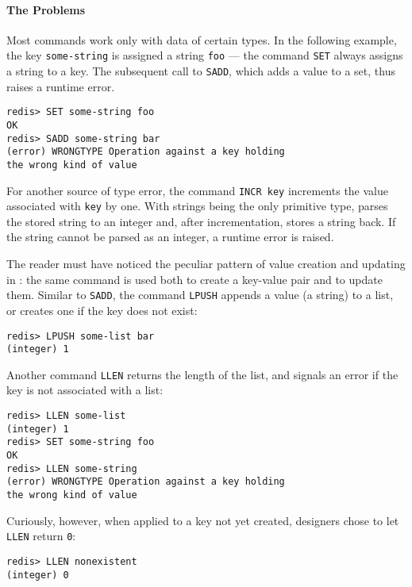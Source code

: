 \paragraph{The Problems} Most commands work only with data of certain types. In
the following example, the key \texttt{some-string} is assigned a string
\texttt{foo} --- the command \texttt{SET} always assigns a string to a key.
The subsequent call to \texttt{SADD}, which adds a value to a set, thus raises a
runtime error.
\begin{Verbatim}[xleftmargin=.4in]
redis> SET some-string foo
OK
redis> SADD some-string bar
(error) WRONGTYPE Operation against a key holding
the wrong kind of value
\end{Verbatim}
\noindent For another source of type error, the command \texttt{INCR key}
increments the value associated with \texttt{key} by one. With strings being the
only primitive type, \Redis{} parses the stored string to an integer and, after
incrementation, stores a string back. If the string cannot be parsed as an
integer, a runtime error is raised.

The reader must have noticed the peculiar pattern of value creation and updating
in \Redis{}: the same command is used both to create a key-value pair and to
update them. Similar to \texttt{SADD}, the command \texttt{LPUSH} appends a
value (a string) to a list, or creates one if the key does not exist:
\begin{Verbatim}[xleftmargin=.4in]
redis> LPUSH some-list bar
(integer) 1
\end{Verbatim}
\noindent Another command \texttt{LLEN} returns the length of the list, and
signals an error if the key is not associated with a list:
\begin{Verbatim}[xleftmargin=.4in]
redis> LLEN some-list
(integer) 1
redis> SET some-string foo
OK
redis> LLEN some-string
(error) WRONGTYPE Operation against a key holding
the wrong kind of value
\end{Verbatim}
\noindent Curiously, however, when applied to a key not yet created, \Redis{}
designers chose to let \texttt{LLEN} return \texttt{0}:
\begin{Verbatim}[xleftmargin=.4in]
redis> LLEN nonexistent
(integer) 0
\end{Verbatim}

